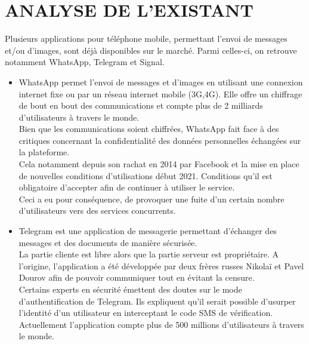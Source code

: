 \chapter{ ANALYSE DE L'EXISTANT}

Plusieurs applications pour téléphone mobile, permettant l'envoi de messages et/ou d'images, sont déjà disponibles sur le marché. Parmi celles-ci, on retrouve notamment WhatsApp, Telegram et Signal.\\
\begin{itemize}
    \item  WhatsApp permet l'envoi de messages et d'images en utilisant une connexion internet fixe ou par un réseau internet mobile (3G,4G). Elle offre un chiffrage de bout en bout des communications et compte plus de 2 milliards d'utilisateurs à travers le monde.\\
    Bien que les communications soient chiffrées, WhatsApp fait face à des critiques concernant la confidentialité des données personnelles échangées sur la plateforme. \\
    Cela notamment depuis son rachat en 2014 par Facebook et la mise en place de nouvelles conditions d'utilisations début 2021. Conditions qu'il est obligatoire d'accepter afin de continuer à utiliser le service. 
    \\Ceci a eu pour conséquence, de provoquer une fuite d'un certain nombre d'utilisateurs vers des services concurrents.\\
    
    \item Telegram est une application de messagerie permettant d'échanger des messages et des documents de manière sécurisée. 
    \\La partie cliente est libre alors que la partie serveur est propriétaire. A l'origine, l'application a été développée par deux frères russes Nikolaï et Pavel Dourov afin de pouvoir communiquer tout en évitant la censure. 
    \\Certains experts en sécurité émettent des doutes sur le mode d'authentification de Telegram. Ils expliquent qu'il serait possible d'usurper l'identité d'un utilisateur en interceptant le code SMS de vérification. 
    \\Actuellement l'application compte plus de 500 millions d'utilisateurs à travers le monde.\\
    

\end{itemize}
